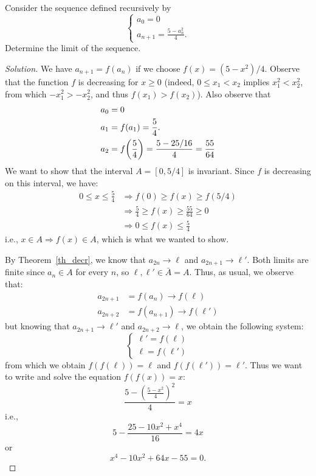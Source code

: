 \begin{exercise}\label{ex_6}
  Consider the sequence defined recursively by
  \[
  \begin{cases}
    a_0 = 0\\
    a_{n+1} = \frac{5-a_n^2}{4}.
  \end{cases}
  \]
  Determine the limit of the sequence.
\end{exercise}

\begin{proof}[Solution]
We have $a_{n+1} = f(a_n)$ if we choose $f(x) = (5-x^2)/4$. Observe
that the function $f$ is decreasing for $x \ge 0$ (indeed, $0 \le x_1 <
x_2$ implies $x_1^2 < x_2^2$, from which $-x_1^2 > -x_2^2$, and thus $f(x_1)
> f(x_2)$). Also observe that
\begin{align*}
a_0 &= 0\\
a_1 &= f(a_1) = \frac 5 4.\\
a_2 &= f{\left( \frac 5 4 \right)} = \frac{5-25/16}{4} = \frac{55}{64}
\end{align*}
We want to show that the interval $A=[0,5/4]$ is invariant. Since
$f$ is decreasing on this interval, we have:
\begin{align*}
0 \le x \le \frac 5 4 &\Rightarrow f(0) \ge f(x) \ge f(5/4)\\
&\Rightarrow \frac 5 4 \ge f(x) \ge \frac{55}{64} \ge 0\\
&\Rightarrow 0 \le f(x) \le \frac 5 4
\end{align*}
i.e., $x\in A \Rightarrow f(x)\in A$, which is what we wanted to show.

By Theorem~\ref{th_decr}, we know that $a_{2n} \to \ell$ and
$a_{2n+1} \to \ell'$. Both limits are finite since $a_n \in A$ for every $n$, so
$\ell, \ell' \in \bar A = A$.
Thus, as usual, we observe that:
\begin{align*}
  a_{2n+1} &= f(a_n) \to f(\ell)  \\
  a_{2n+2} &= f(a_{n+1}) \to f(\ell')
\end{align*}
but knowing that $a_{2n+1}\to \ell'$ and $a_{2n+2}\to \ell$, we obtain the
following system:
\[
\begin{cases}
  \ell' = f(\ell)\\
  \ell = f(\ell')
\end{cases}
\]
from which we obtain $f(f(\ell))=\ell$ and $f(f(\ell'))=\ell'$. Thus
we want to write and solve the equation $f(f(x))=x$:
\[
\frac{5-\left(\frac{5-x^2}{4}\right)^2}{4} = x
\]
i.e.,
\[
5 - \frac{25 - 10x^2 + x^4}{16} = 4x
\]
or
\[
x^4 - 10 x^2 + 64 x - 55 = 0.
\]


\end{proof}

